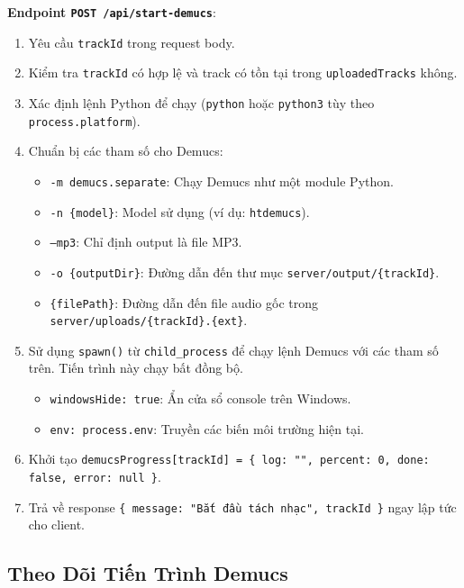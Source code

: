 \documentclass[12pt,a4paper]{article}
\begin{document}
\textbf{Endpoint \texttt{POST /api/start-demucs}}:
\begin{enumerate}
    \item Yêu cầu \texttt{trackId} trong request body.
    \item Kiểm tra \texttt{trackId} có hợp lệ và track có tồn tại trong \texttt{uploadedTracks} không.
    \item Xác định lệnh Python để chạy (\texttt{python} hoặc \texttt{python3} tùy theo \texttt{process.platform}).
    \item Chuẩn bị các tham số cho Demucs:
        \begin{itemize}
            \item \texttt{-m demucs.separate}: Chạy Demucs như một module Python.
            \item \texttt{-n \{model\}}: Model sử dụng (ví dụ: \texttt{htdemucs}).
            \item \texttt{--mp3}: Chỉ định output là file MP3.
            \item \texttt{-o \{outputDir\}}: Đường dẫn đến thư mục \texttt{server/output/\{trackId\}}.
            \item \texttt{\{filePath\}}: Đường dẫn đến file audio gốc trong \texttt{server/uploads/\{trackId\}.\{ext\}}.
        \end{itemize}
    \item Sử dụng \texttt{spawn()} từ \texttt{child\_process} để chạy lệnh Demucs với các tham số trên. Tiến trình này chạy bất đồng bộ.
        \begin{itemize}
            \item \texttt{windowsHide: true}: Ẩn cửa sổ console trên Windows.
            \item \texttt{env: process.env}: Truyền các biến môi trường hiện tại.
        \end{itemize}
    \item Khởi tạo \texttt{demucsProgress[trackId] = \{ log: "", percent: 0, done: false, error: null \}}.
    \item Trả về response \texttt{\{ message: "Bắt đầu tách nhạc", trackId \}} ngay lập tức cho client.
\end{enumerate}

\subsection{Theo Dõi Tiến Trình Demucs}
\label{subsec:demucs-monitoring}
\end{document}
